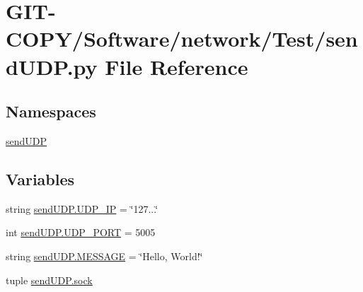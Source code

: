 \hypertarget{GIT-COPY_2Software_2network_2Test_2sendUDP_8py}{}\section{G\+I\+T-\/\+C\+O\+P\+Y/\+Software/network/\+Test/send\+U\+D\+P.py File Reference}
\label{GIT-COPY_2Software_2network_2Test_2sendUDP_8py}
\subsection*{Namespaces}
\begin{DoxyCompactItemize}
\item 
 \hyperlink{namespacesendUDP}{send\+U\+D\+P}
\end{DoxyCompactItemize}
\subsection*{Variables}
\begin{DoxyCompactItemize}
\item 
string \hyperlink{namespacesendUDP_a51b8da19fc2ba1a4cbfc9711483430d5}{send\+U\+D\+P.\+U\+D\+P\+\_\+\+I\+P} = \char`\"{}127...\char`\"{}
\item 
int \hyperlink{namespacesendUDP_abc1722f41699039c028eff6051422d9f}{send\+U\+D\+P.\+U\+D\+P\+\_\+\+P\+O\+R\+T} = 5005
\item 
string \hyperlink{namespacesendUDP_a0c110c792a80af2a5f6772a9ae92c540}{send\+U\+D\+P.\+M\+E\+S\+S\+A\+G\+E} = \char`\"{}Hello, World!\char`\"{}
\item 
tuple \hyperlink{namespacesendUDP_a89183ad85baed424508f175ee5f268a8}{send\+U\+D\+P.\+sock}
\end{DoxyCompactItemize}
